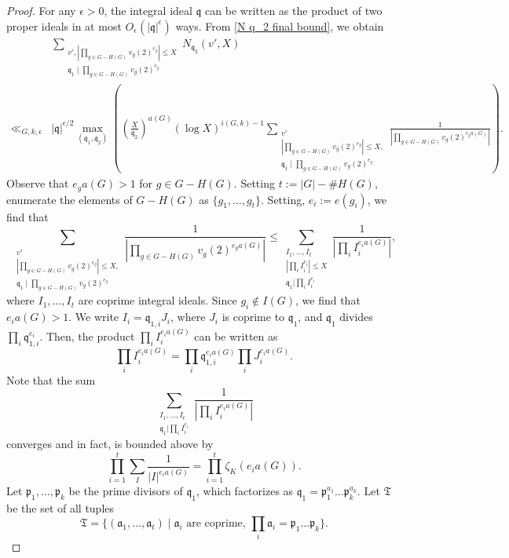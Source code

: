 \documentclass[11pt]{amsart}
\newcommand{\fq}{\mathfrak{q}}
\newcommand{\fp}{\mathfrak{p}}
\newcommand{\op}[1]{\operatorname{#1}}
\numberwithin{equation}{section}
\begin{document}
\begin{proof}
    \par For any $\epsilon>0$, the integral ideal $\fq$ can be written as the product of two proper ideals in at most $O_{\epsilon}(|\fq|^{\epsilon})$ ways.
    From \eqref{N q_2 final bound}, we obtain
    \begin{equation}\label{important bound}\begin{split} & \sum_{\substack{v',|\prod_{g \in G-H(G)}v_g(2)^{e_g}|\leq X\\ \fq_1 \mid \prod_{g \in G-H(G)}v_g(2)^{e_g}}}N_{\fq_2}(v',X) \\
    \ll_{G,k,\epsilon} & |\fq|^{\epsilon/2}\op{max}_{(\fq_1, \fq_2)}\left(\left(\frac{X}{\fq_2}\right)^{a(G)}(\log X)^{i(G,k)-1} \sum_{\substack{v'\\ |\prod_{g \in G-H(G)}v_g(2)^{e_g}|\leq X,\\ \fq_1 \mid \prod_{g \in G-H(G)}v_g(2)^{e_g}}} \frac{1}{|\prod_{g \in G-H(G)}v_g(2)^{e_g a(G)}|}\right).
    \end{split}
    \end{equation}
    Observe that $e_g a(G) > 1$ for $g \in G-H(G)$. Setting $t:=|G|-\#H(G)$, enumerate the elements of $G-H(G)$ as $\{g_1, \dots, g_t\}$. Setting, $e_i:=e(g_i)$, we find that
    \[\sum_{\substack{v'\\ |\prod_{g \in G-H(G)}v_g(2)^{e_g}|\leq X,\\ \fq_1 \mid \prod_{g \in G-H(G)}v_g(2)^{e_g}}} \frac{1}{|\prod_{g \in G-H(G)}v_g(2)^{e_g a(G)}|}\leq \sum_{\substack{I_1, \dots, I_{t}\\ |\prod_i I_i^{e_i}|\leq X\\ \fq_1| \prod_i I_i^{e_i}}} \frac{1}{|\prod_i I_i^{e_i a(G)}|},\]
    where $I_1, \dots, I_t$ are coprime integral ideals. Since $g_i\notin I(G)$, we find that $e_i a(G)>1$. We write $I_i= \fq_{1,i} J_i$, where $J_i$ is coprime to $\fq_1$, and $\fq_1$ divides $\prod_i \fq_{1,i}^{e_i}$. Then, the product $\prod_i I_i ^{e_i a(G)}$ can be written as
    \[\prod_i I_i ^{e_i a(G)}=\prod_i \fq_{1,i} ^{e_i a(G)}\prod_i J_i ^{e_i a(G)}.\]
    Note that the sum 
    \[\sum_{\substack{I_1, \dots, I_{t}\\  \fq_1| \prod_i I_i^{e_i}}} \frac{1}{|\prod_i I_i^{e_i a(G)}|}\] converges and in fact, is bounded above by 
    \[\prod_{i=1}^t\sum_{I} \frac{1}{|I|^{e_i a(G)}}=\prod_{i=1}^t \zeta_{K}(e_i a(G)).\] Let $\fp_1, \dots, \fp_k$ be the prime divisors of $\fq_1$, which factorizes as $\fq_1= \fp_1^{a_1}\dots \fp_k^{a_k}$. Let $\mathfrak{T}$ be the set of all tuples 
    \[\mathfrak{T}=\{(\mathfrak{a}_1, \dots, \mathfrak{a}_t)\mid \mathfrak{a}_i\text{ are coprime, }\prod_i \mathfrak{a}_i=\fp_1\dots \fp_k\}.\]

\end{proof}
\end{document}
